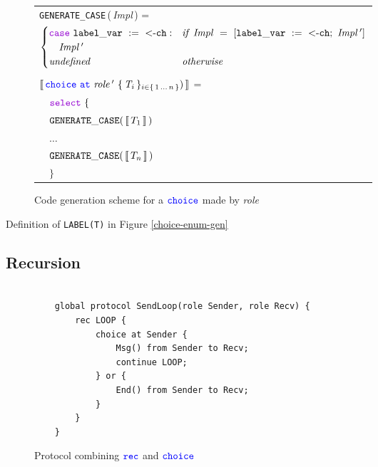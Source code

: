 \documentclass[12pt,twoside]{report}
\begin{document}
\begin{figure}[!h]
    \begin{center}
        \begin{tabular}{l}
            \texttt{GENERATE\_CASE}\,(\,\textit{Impl}\,) = \\[3pt]
            \begin{math}
                \begin{cases}
                    \gocase\ \assignment{label\_var}{\text{<-}\varname{ch}}: & \mathit{if}\ \mathit{Impl}\ =\ [\assignment{label\_var}{\text{<-}\varname{ch}};\ \mathit{Impl\,'}]\\
                    \quad \mathit{Impl\,'} & \\
                    \mathit{undefined} & \mathit{otherwise}
                \end{cases}
            \end{math}\\\\[6pt]

            $\llbracket\,{\color{blue}\mathtt{choice}}\ {\color{blue}\mathtt{at}}\ \mathit{role\,'}\ \{\,\mathit{T}_{i}\,\}_{{i \in \{\,1\,\dots\,n\,\}}})\,\rrbracket$ =\\[10pt]
            
            $\quad \goselect\ \{$\\[3pt]

            $\quad \mathtt{GENERATE\_CASE}(\, \llbracket\,T_1\,\rrbracket\,)$\\[6pt]

            $\quad \dots$\\[9pt]
            
            $\quad \mathtt{GENERATE\_CASE}(\, \llbracket\,T_n\,\rrbracket\,)$\\[6pt]
            $\quad \}$\\
        \end{tabular}
    \end{center}
    \caption{Code generation scheme for a ${\color{blue}\mathtt{choice}}$ made by \textit{role}}
    \label{role-receives-choice-codegen}
\end{figure}

Definition of \texttt{LABEL(T)} in Figure \ref{choice-enum-gen}

\subsection{Recursion}\label{recursion-limitations}

\begin{figure}[htb!]
    \centering
    \lstset{language=Scribble}
    \begin{lstlisting}
    
    global protocol SendLoop(role Sender, role Recv) {
        rec LOOP {
            choice at Sender {
                Msg() from Sender to Recv;
                continue LOOP;
            } or {
                End() from Sender to Recv;
            }
        }
    }
    \end{lstlisting}
    \caption{Protocol combining ${\color{blue}\mathtt{rec}}$ and ${\color{blue}\mathtt{choice}}$}
    \label{scribble-nested-local}
\end{figure}{}
\end{document}
